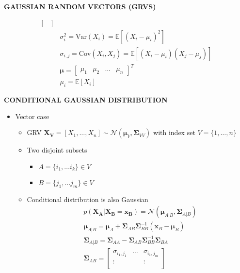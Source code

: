 \begin{whitebox}{\textbf{GAUSSIAN RANDOM VECTORS (GRVS)}}
\begin{itemize}
\begin{align*}
\begin{bmatrix}
            \end{bmatrix}\\
            &\sigma_i^2=\mathrm{Var}(X_i)=\mathbb{E}[(X_i-\mu_i)^2]\\
            &\sigma_{i,j}=\mathrm{Cov}(X_i,X_j)=\mathbb{E}[(X_i-\mu_i)(X_j-\mu_j)]\\
            &\bm{\mu}=\begin{bmatrix}
                \mu_1 & \mu_2 & \hdots & \mu_n
            \end{bmatrix}^T\\
            &\mu_i=\mathbb{E}[X_i]
        \end{align*}
    \end{itemize}
\end{whitebox}

\begin{whitebox}{\textbf{CONDITIONAL GAUSSIAN DISTRIBUTION}}
    \begin{itemize}
        \item Vector case
        \begin{itemize}
            \item GRV
            $\bm{X_V}=[X_1,\hdots,X_n]\sim\mathcal{N}(\bm{\mu}_V,\bm{\Sigma}_{VV})$ with index set $V=\{1,\hdots,n\}$
            \item Two disjoint subsets
            \begin{itemize}
                \item $A=\{i_1,\hdots i_k\}\in V$
                \item $B=\{j_1,\hdots j_m\}\in V$
            \end{itemize}
            \item Conditional distribution is also Gaussian
                \begin{align*}
                    &p(\bm{X_A}| \bm{X_B}=\bm{x_B})=\mathcal{N}(\bm{\mu}_{A| B},\bm{\Sigma}_{A| B})\\
                    & \bm{\mu}_{A|B}=\bm{\mu}_A+\bm{\Sigma}_{AB} \bm{\Sigma}_{BB}^{-1}\left(\bm{x}_B-\bm{\mu}_B\right) \\
                    & \bm{\Sigma}_{A|B}=\bm{\Sigma}_{AA}-\bm{\Sigma}_{AB} \bm{\Sigma}_{BB}^{-1} \bm{\Sigma}_{BA}\\
                    &\bm{\Sigma}_{AB}=
                    \begin{bmatrix}
                        \sigma_{i_1,j_1} & \hdots & \sigma_{i_1,j_m}\\
                        \vdots & & \vdots\\

\end{bmatrix}
\end{align*}
\end{itemize}
\end{itemize}
\end{whitebox}

